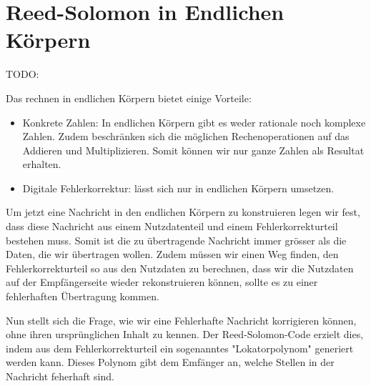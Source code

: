 %
%
%
\section{Reed-Solomon in Endlichen Körpern
\label{reedsolomon:section:endlichekoerper}}

TODO:

Das rechnen in endlichen Körpern bietet einige Vorteile:

\begin{itemize}
	\item Konkrete Zahlen: In endlichen Körpern gibt es weder rationale noch komplexe Zahlen. Zudem beschränken sich die möglichen Rechenoperationen auf das Addieren und Multiplizieren. Somit können wir nur ganze Zahlen als Resultat erhalten.
	
	\item Digitale Fehlerkorrektur: lässt sich nur in endlichen Körpern umsetzen. 
	
\end{itemize}

Um jetzt eine Nachricht in den endlichen Körpern zu konstruieren legen wir fest, dass diese Nachricht aus einem Nutzdatenteil und einem Fehlerkorrekturteil bestehen muss. Somit ist die zu übertragende Nachricht immer grösser als die Daten, die wir übertragen wollen. Zudem müssen wir einen Weg finden, den Fehlerkorrekturteil so aus den Nutzdaten zu berechnen, dass wir die Nutzdaten auf der Empfängerseite wieder rekonstruieren können, sollte es zu einer fehlerhaften Übertragung kommen.

Nun stellt sich die Frage, wie wir eine Fehlerhafte Nachricht korrigieren können, ohne ihren ursprünglichen Inhalt zu kennen. Der Reed-Solomon-Code erzielt dies, indem aus dem Fehlerkorrekturteil ein sogenanntes "Lokatorpolynom" generiert werden kann. Dieses Polynom gibt dem Emfänger an, welche Stellen in der Nachricht feherhaft sind. 
